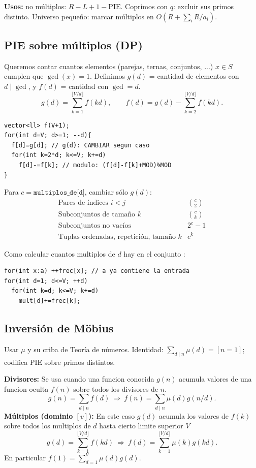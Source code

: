 \textbf{Usos:} no múltiplos: $R-L+1-\mathrm{PIE}$. Coprimos con $q$: excluir sus primos distinto. Universo pequeño: marcar múltiplos en $O(R+\sum_i R/a_i)$.




\subsection{PIE sobre múltiplos (DP)}
Queremos contar cuantos elementos (parejas, ternas, conjuntos, ...) $x\in S$ cumplen que $\gcd(x)=1$.
Definimos $g(d)$ = cantidad de elementos con $d\mid\gcd$, y $f(d)$ = cantidad con $\gcd=d$.
\[
g(d)=\sum_{k=1}^{\lfloor V/d\rfloor}f(kd),\qquad
f(d)=g(d)-\sum_{k=2}^{\lfloor V/d\rfloor}f(kd).
\]


\begin{verbatim}
vector<ll> f(V+1);
for(int d=V; d>=1; --d){
  f[d]=g[d]; // g(d): CAMBIAR segun caso
  for(int k=2*d; k<=V; k+=d)
    f[d]-=f[k]; // modulo: (f[d]-f[k]+MOD)%MOD
}
\end{verbatim}

Para $c=\texttt{multiplos\_de[d]}$, cambiar sólo $g(d)$:
\[
\begin{array}{c|c}
\text{Pares de índices }i<j&\binom c2\\
\text{Subconjuntos de tamaño }k&\binom ck\\
\text{Subconjuntos no vacíos}&2^c-1\\
\text{Tuplas ordenadas, repetición, tamaño }k&c^k
\end{array}
\]

Como calcular cuantos multiplos de $d$ hay en el conjunto :

\begin{verbatim}
for(int x:a) ++frec[x]; // a ya contiene la entrada
for(int d=1; d<=V; ++d)
  for(int k=d; k<=V; k+=d)
    mult[d]+=frec[k];
\end{verbatim}


\subsection{Inversión de Möbius}
Usar $\mu$ y su criba de Teoría de números. Identidad: $\sum_{d\mid n}\mu(d)=[n=1]$; codifica PIE sobre primos distintos.


\textbf{Divisores:}
Se usa cuando una funcion conocida $g(n)$ acumula valores de una funcion oculta $f(n)$ sobre todos los divisores de $n$.
\[
g(n)=\sum_{d\mid n}f(d)
\ \Longrightarrow\ f(n)=\sum_{d\mid n}\mu(d)g(n/d).
\]
\textbf{Múltiplos (dominio $[v]$):}
En este caso $g(d)$ acumula los valores de $f(k)$ sobre todos los multiplos de $d$ hasta cierto limite superior $V$
\[
g(d)=\sum_{k=1}^{\lfloor V/d\rfloor}f(kd)
\ \Longrightarrow\ f(d)=\sum_{k=1}^{\lfloor V/d\rfloor}\mu(k)g(kd).
\]
En particular $f(1)=\sum_{d=1}^V\mu(d)g(d)$. 

